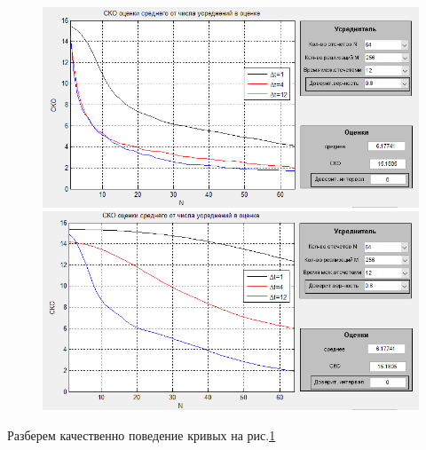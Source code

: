 \begin{figure}[H]
    \begin{minipage}{0.49\linewidth}
        \centering
        \includegraphics[width=0.95\linewidth]{fig/fig31}
        \caption*{$\tau_\text{кор} = 10$}
    \end{minipage}
    \begin{minipage}{.49\linewidth}
        \centering
        \includegraphics[width=0.95\linewidth]{fig/fig32}
        \caption*{$\tau_\text{кор} = 100$}
    \end{minipage}
	\caption{}
	\label{fig:3}
\end{figure}
Разберем качественно поведение кривых на рис.\ref{fig:3} 

